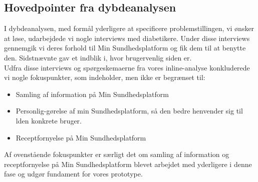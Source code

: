 \subsection{Hovedpointer fra dybdeanalysen}
I dybdeanalysen, med formål yderligere at specificere problemstillingen, vi ønsker at løse, udarbejdede vi nogle interviews med diabetikere. Under disse interviews gennemgik vi deres forhold til Min Sundhedsplatform og fik dem til at benytte den. Sidstnævnte gav et indblik i, hvor brugervenlig siden er.\\
Udfra disse interviews og spørgeskemaerne fra vores inline-analyse konkluderede vi nogle fokuspunkter, som indeholder, men ikke er begrænset til:
\begin{itemize}
  \item Samling af information på Min Sundhedsplatform
  \item Personlig-gørelse af min Sundhedsplatform, så den bedre henvender sig til lden konkrete bruger.
  \item Receptfornyelse på Min Sundhedsplatform 
\end{itemize}
Af ovenstående fokuspunkter er særligt det om samling af information og receptfornyelse på Min Sundhedsplatform blevet arbejdet med yderligere i denne fase og udgør fundament for vores prototype. 
